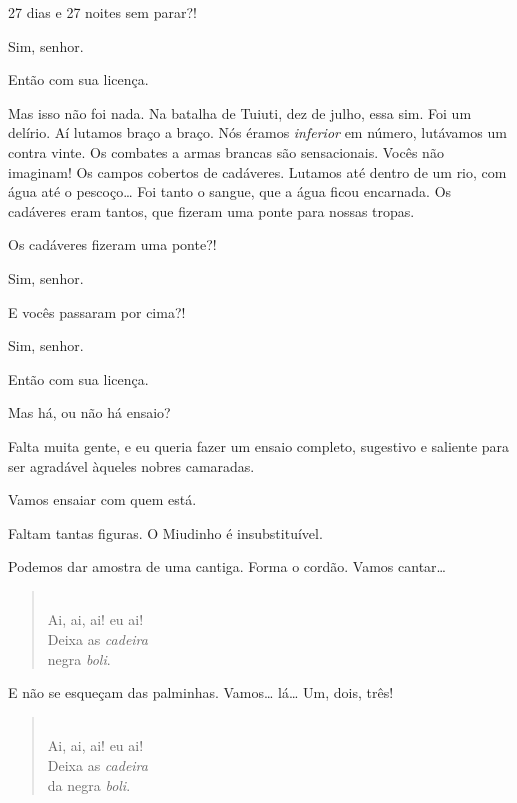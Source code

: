 \begin{linenumbers}
 27 dias e 27 noites sem parar?!

 Sim, senhor.

 Então com sua licença.  

 Mas isso não foi nada. Na batalha de Tuiuti, dez de julho,
essa sim. Foi um delírio. Aí lutamos braço a braço. Nós éramos \textit{inferior}
em número, lutávamos um contra vinte. Os combates a armas brancas são
sensacionais. Vocês não imaginam! Os campos cobertos de cadáveres. Lutamos até
dentro de um rio, com água até o pescoço\ldots{} Foi tanto o sangue, que a água ficou
encarnada. Os cadáveres eram tantos, que fizeram uma ponte para nossas tropas.

 Os cadáveres fizeram uma ponte?!

 Sim, senhor.

 E vocês passaram por cima?!

 Sim, senhor.

 Então com sua licença.  

 Mas há, ou não há ensaio?

 Falta muita gente, e eu queria fazer um ensaio completo,
sugestivo e saliente para ser agradável àqueles nobres camaradas.

 Vamos ensaiar com quem está.

 Faltam tantas figuras. O Miudinho é insubstituível.

 Podemos dar amostra de uma cantiga. Forma o cordão.
Vamos cantar\ldots{}

\begin{verse}
 \\
Ai, ai, ai! eu ai!\\
Deixa as \textit{cadeira}\\
negra \textit{boli}.
\end{verse}

 E não se esqueçam das palminhas. Vamos\ldots{} 
lá\ldots{} Um, dois, três!  

\begin{verse}
 \\
Ai, ai, ai! eu ai!\\
Deixa as \textit{cadeira}\\
da negra \textit{boli}.
\end{verse}


\end{linenumbers}
